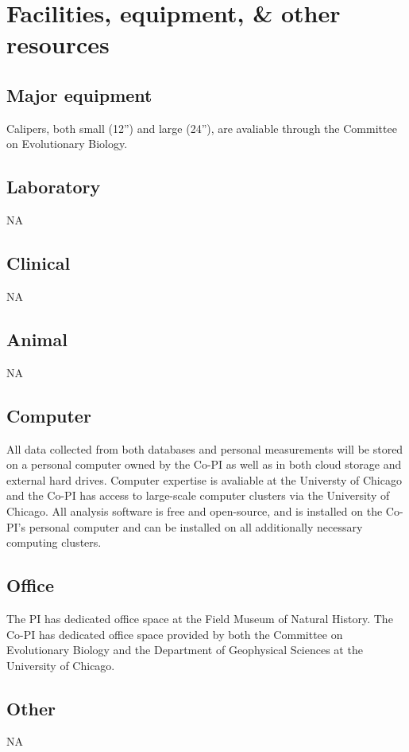 \documentclass[11pt,letterpaper]{article}
\begin{document}
\setcounter{secnumdepth}{0}
\section{Facilities, equipment, \& other resources}

\subsection{Major equipment}
Calipers, both small (12'') and large (24''), are avaliable through the Committee on Evolutionary Biology.

\subsection{Laboratory}
NA

\subsection{Clinical}
NA

\subsection{Animal}
NA

\subsection{Computer}
All data collected from both databases and personal measurements will be stored on a personal computer owned by the Co-PI as well as in both cloud storage and external hard drives. Computer expertise is avaliable at the Universty of Chicago and the Co-PI has access to large-scale computer clusters via the University of Chicago. All analysis software is free and open-source, and is installed on the Co-PI's personal computer and can be installed on all additionally necessary computing clusters.

\subsection{Office}
The PI has dedicated office space at the Field Museum of Natural History. The Co-PI has dedicated office space provided by both the Committee on Evolutionary Biology and the Department of Geophysical Sciences at the University of Chicago.

\subsection{Other}
NA
\end{document}

